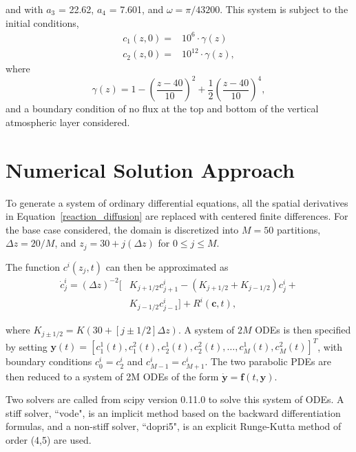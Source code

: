 \documentclass[twocolumn,10pt]{asme2ej}
\begin{document}
and with $a_3$ = 22.62, $a_4$ = 7.601, and $\omega = \pi/43200$. This system is subject to the initial conditions,
\begin{equation}
\begin{split}
c_1(z, 0) = & 10^6    \cdot \gamma(z)     \\
c_2(z, 0) = & 10^{12} \cdot \gamma(z),
\end{split}
\end{equation}
where
\begin{equation}
\gamma(z) = 1 - \left(\frac{z-40}{10} \right)^2 + \frac{1}{2} \left(\frac{z-40}{10} \right)^4,
\end{equation}
and a boundary condition of no flux at the top and bottom of the vertical atmospheric layer considered.

\section{Numerical Solution Approach}

To generate a system of ordinary differential equations, all the spatial derivatives in Equation~\ref{reaction_diffusion} are replaced with centered finite differences. For the base case considered, the domain is discretized into $M = 50$ partitions, $\Delta z = 20/M$, and $z_j = 30 + j(\Delta z)$ for $0 \leq j \leq M$.

The function $c^i(z_j,t)$ can then be approximated as
\begin{equation}
\begin{split}
\dot c^i_j = (\Delta z)^{-2} [& K_{j+1/2} c^i_{j+1} - (K_{j+1/2} +  K_{j-1/2}) c^i_{j} + \\
& K_{j-1/2} c^i_{j-1}] + R^i(\boldsymbol{c}, t),
\end{split}
\end{equation}

\noindent where $K_{j \pm 1/2} = K(30+[j \pm 1/2] \Delta z)$. A system of $2M$ ODEs is then specified by setting $\boldsymbol{y}(t)=[c^1_1(t), c^2_1(t), c^1_2(t), c^2_2(t), \ldots, c^1_M(t),c^2_M(t)]^T$, with boundary conditions $c^i_0 = c^i_2$ and $c^i_{M-1} = c^i_{M+1}$. The two parabolic PDEs are then reduced to a system of 2M ODEs of the form $\dot{\boldsymbol{y}} = \boldsymbol{f} (t, \boldsymbol{y})$.

Two solvers are called from scipy version 0.11.0 to solve this system of ODEs. A stiff solver, ``vode", is an implicit method based on the backward differentiation formulas, and a non-stiff solver, ``dopri5", is an explicit Runge-Kutta method of order (4,5) are used.
\end{document}
